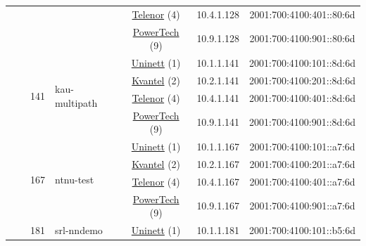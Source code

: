 \begin{small}
\begin{center}
\begin{longtable}{|c|c|c|c|c|c|c|c|}
  &  &  &  & \multicolumn{2}{|c|}{\tiny{\href{https://www.telenor.no}{Telenor} (4)}} & \tiny{10.4.1.128} & \tiny{2001:700:4100:401::80:6d} \\* \cline{5-5}\cline{6-6}\cline{7-7}\cline{8-8}
  &  &  &  & \multicolumn{2}{|c|}{\tiny{\href{http://www.powertech.no}{PowerTech} (9)}} & \tiny{10.9.1.128} & \tiny{2001:700:4100:901::80:6d} \\* \cline{3-3}\cline{4-4}\cline{5-5}\cline{6-6}\cline{7-7}\cline{8-8}
  &  & \multirow{4}{*}{\tiny{141}} & \multicolumn{1}{|l|}{\multirow{4}{*}{\tiny{kau-multipath}}} & \multicolumn{2}{|c|}{\tiny{\href{https://www.uninett.no}{Uninett} (1)}} & \tiny{10.1.1.141} & \tiny{2001:700:4100:101::8d:6d} \\* \cline{5-5}\cline{6-6}\cline{7-7}\cline{8-8}
  &  &  &  & \multicolumn{2}{|c|}{\tiny{\href{http://kvantel.no}{Kvantel} (2)}} & \tiny{10.2.1.141} & \tiny{2001:700:4100:201::8d:6d} \\* \cline{5-5}\cline{6-6}\cline{7-7}\cline{8-8}
  &  &  &  & \multicolumn{2}{|c|}{\tiny{\href{https://www.telenor.no}{Telenor} (4)}} & \tiny{10.4.1.141} & \tiny{2001:700:4100:401::8d:6d} \\* \cline{5-5}\cline{6-6}\cline{7-7}\cline{8-8}
  &  &  &  & \multicolumn{2}{|c|}{\tiny{\href{http://www.powertech.no}{PowerTech} (9)}} & \tiny{10.9.1.141} & \tiny{2001:700:4100:901::8d:6d} \\* \cline{3-3}\cline{4-4}\cline{5-5}\cline{6-6}\cline{7-7}\cline{8-8}
  &  & \multirow{4}{*}{\tiny{167}} & \multicolumn{1}{|l|}{\multirow{4}{*}{\tiny{ntnu-test}}} & \multicolumn{2}{|c|}{\tiny{\href{https://www.uninett.no}{Uninett} (1)}} & \tiny{10.1.1.167} & \tiny{2001:700:4100:101::a7:6d} \\* \cline{5-5}\cline{6-6}\cline{7-7}\cline{8-8}
  &  &  &  & \multicolumn{2}{|c|}{\tiny{\href{http://kvantel.no}{Kvantel} (2)}} & \tiny{10.2.1.167} & \tiny{2001:700:4100:201::a7:6d} \\* \cline{5-5}\cline{6-6}\cline{7-7}\cline{8-8}
  &  &  &  & \multicolumn{2}{|c|}{\tiny{\href{https://www.telenor.no}{Telenor} (4)}} & \tiny{10.4.1.167} & \tiny{2001:700:4100:401::a7:6d} \\* \cline{5-5}\cline{6-6}\cline{7-7}\cline{8-8}
  &  &  &  & \multicolumn{2}{|c|}{\tiny{\href{http://www.powertech.no}{PowerTech} (9)}} & \tiny{10.9.1.167} & \tiny{2001:700:4100:901::a7:6d} \\* \cline{3-3}\cline{4-4}\cline{5-5}\cline{6-6}\cline{7-7}\cline{8-8}
  &  & \multirow{4}{*}{\tiny{181}} & \multicolumn{1}{|l|}{\multirow{4}{*}{\tiny{srl-nndemo}}} & \multicolumn{2}{|c|}{\tiny{\href{https://www.uninett.no}{Uninett} (1)}} & \tiny{10.1.1.181} & \tiny{2001:700:4100:101::b5:6d} \\* \cline{5-5}\cline{6-6}\cline{7-7}\cline{8-8}

\end{longtable}
\end{center}
\end{small}
